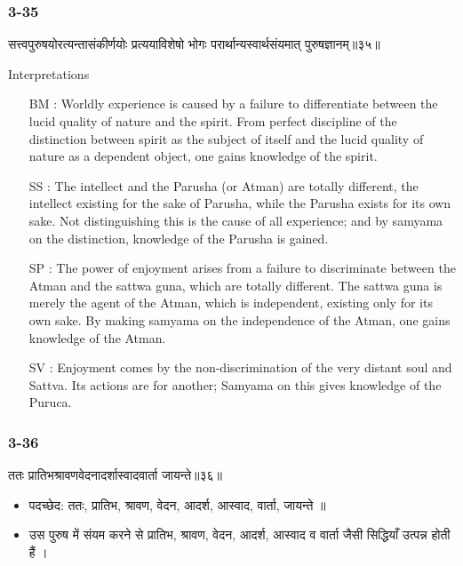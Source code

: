 \begin{frame}[fragile]\frametitle{3-35}
\begin{sanskrit}
सत्त्वपुरुषयोरत्यन्तासंकीर्णयोः प्रत्ययाविशेषो भोगः परार्थान्यस्वार्थसंयमात् पुरुषज्ञानम्॥३५॥
\end{sanskrit}

Interpretations
\begin{itemize}	
\item [BM]: Worldly experience is caused by a failure to differentiate between the lucid quality of nature and the spirit. From perfect discipline of the distinction between spirit as the subject of itself and the lucid quality of nature as a dependent object, one gains knowledge of the spirit.
\item [SS]: The intellect and the Parusha (or Atman) are totally different, the intellect existing for the sake of Parusha, while the Parusha exists for its own sake. Not distinguishing this is the cause of all experience; and by samyama on the distinction, knowledge of the Parusha is gained.
\item [SP]: The power of enjoyment arises from a failure to discriminate between the Atman and the sattwa guna, which are totally different. The sattwa guna is merely the agent of the Atman, which is independent, existing only for its own sake. By making samyama on the independence of the Atman, one gains knowledge of the Atman.
\item [SV]: Enjoyment comes by the non-discrimination of the very distant soul and Sattva. Its actions are for another; Samyama on this gives knowledge of the Puruca. 
\end{itemize}
\end{frame}

\begin{frame}[fragile]\frametitle{3-36}
\begin{sanskrit}
ततः प्रातिभश्रावणवेदनादर्शास्वादवार्ता जायन्ते॥३६॥
\end{sanskrit}

\begin{itemize}
\item पदच्छेद:  ततः, प्रातिभ, श्रावण, वेदन, आदर्श, आस्वाद, वार्ता, जायन्ते ॥
\item उस पुरुष में संयम करने से प्रातिभ, श्रावण, वेदन, आदर्श, आस्वाद व वार्ता जैसी सिद्धियाँ उत्पन्न होती हैं ।
\end{itemize}
\end{frame}


